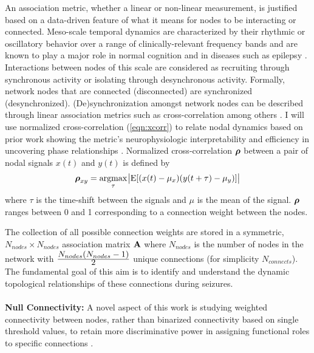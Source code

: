 An association metric, whether a linear or non-linear measurement, is justified based on a data-driven feature of what it means for nodes to be interacting or connected. Meso-scale temporal dynamics are characterized by their rhythmic or oscillatory behavior over a range of clinically-relevant frequency bands and are known to play a major role in normal cognition \cite{buzsaki2006rhythms} and in diseases such as epilepsy \cite{uhlhaas2006neural, jiruska2012synchronization}. Interactions between nodes of this scale are considered as recruiting through synchronous activity or isolating through desynchronous activity. Formally, network nodes that are connected (disconnected) are synchronized (desynchronized). (De)synchronization amongst network nodes can be described through linear association metrics such as cross-correlation among others \cite{pereda2005nonlinear}. I will use normalized cross-correlation (\ref{eqn:xcorr}) to relate nodal dynamics based on prior work showing the metric's neurophysiologic interpretability and efficiency in uncovering phase relationships \cite{schiff2005neuronal, kramer2010coalescence}. Normalized cross-correlation $\boldsymbol{\displaystyle \rho}$ between a pair of nodal signals $x(t)$ and $y(t)$ is defined by
\begin{eqnarray}
\label{eqn:xcorr}
    \boldsymbol{\displaystyle \rho}_{xy} = \underset{\tau}{\operatorname{argmax}}\:{\abs{\mathrm{E}[(x(t) - \mu_{x})(y(t+\tau) - \mu_{y})]}}
\end{eqnarray}
where $\tau$ is the time-shift between the signals and $\mu$ is the mean of the signal. $\boldsymbol{\displaystyle \rho}$ ranges between 0 and 1 corresponding to a connection weight between the nodes.

The collection of all possible connection weights are stored in a symmetric, $N_{nodes} \times N_{nodes}$ association matrix $\mathbf{\displaystyle A}$ where $N_{nodes}$ is the number of nodes in the network with $\frac{\displaystyle N_{nodes}(N_{nodes}-1)}{\displaystyle 2}$ unique connections (for simplicity $N_{connects}$). The fundamental goal of this aim is to identify and understand the dynamic topological relationships of these connections during seizures.
~\\
~\\
\textbf{Null Connectivity:}
A novel aspect of this work is studying weighted connectivity between nodes, rather than binarized connectivity based on single threshold values, to retain more discriminative power in assigning functional roles to specific connections \cite{bullmore2011brain}.

